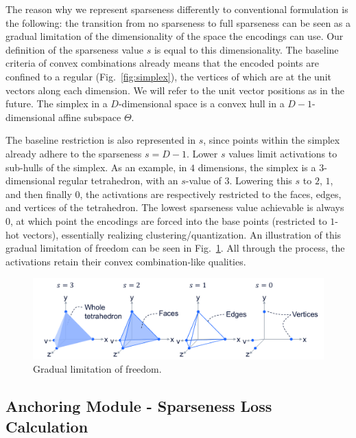 			The reason why we represent sparseness differently to conventional formulation is the following: the transition from no sparseness to full sparseness can be seen as a gradual limitation of the dimensionality of the space the encodings can use.
			Our definition of the sparseness value $s$ is equal to this dimensionality.
			The baseline criteria of convex combinations already means that the encoded points are confined to a regular  (Fig.~\ref{fig:simplex}), the vertices of which are at the unit vectors along each dimension.
			We will refer to the unit vector positions as  in the future.
			The simplex in a $D$-dimensional space is a convex hull in a $D-1$-dimensional affine subspace $\Theta$.
			
			The baseline restriction is also represented in $s$, since points within the simplex already adhere to the sparseness $s = D-1$.
			Lower $s$ values limit activations to sub-hulls of the simplex.
			As an example, in $4$ dimensions, the simplex is a $3$-dimensional regular tetrahedron, with an $s$-value of $3$.
			Lowering this $s$ to $2$, $1$, and then finally $0$, the activations are respectively restricted to the faces, edges, and vertices of the tetrahedron.
			The lowest sparseness value achievable is always $0$, at which point the encodings are forced into the base points (restricted to $1$-hot vectors), essentially realizing clustering/quantization.
			An illustration of this gradual limitation of freedom can be seen in Fig.~\ref{fig:limit_freedom}.
			All through the process, the activations retain their convex combination-like qualities.
			
			\begin{figure}[ht]
				\centering
				\includegraphics[width=\linewidth]{figures/06_sparse_clust/limit_freedom/limit_freedom.pdf}
				\caption[Gradual limitation of freedom in SCA]{Gradual limitation of freedom.}
				\label{fig:limit_freedom}
			\end{figure}
			
		\subsection{Anchoring Module - Sparseness Loss Calculation}
			

